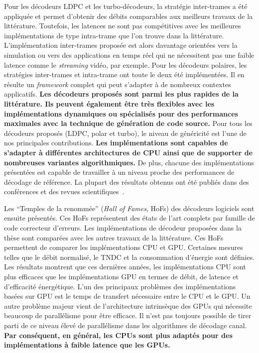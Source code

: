 Pour les décodeurs LDPC et les turbo-décodeurs, la stratégie inter-trames a été
appliquée et permet d'obtenir des débits comparables aux meilleurs travaux de la
littérature. Toutefois, les latences ne sont pas compétitives avec les
meilleures implémentations de type intra-trame que l'on trouve dans la
littérature. L'implémentation inter-trames proposée est alors davantage
orientées vers la simulation ou vers des applications en temps réel qui ne
nécessitent pas une faible latence comme le \emph{streaming} vidéo, par exemple.
Pour les décodeurs polaires, les stratégies inter-trames et intra-trame ont
toute le deux été implémentées. Il en résulte un \emph{framework} complet qui
peut s'adapter à de nombreux contextes applicatifs. \textbf{Les décodeurs
proposés sont parmi les plus rapides de la littérature. Ils peuvent également
être très flexibles avec les implémentations dynamiques ou spécialisés pour des
performances maximales avec la technique de génération de code source.} Pour
tous les décodeurs proposés (LDPC, polar et turbo), le niveau de généricité est
l'une de nos principales contributions. \textbf{Les implémentations sont
capables de s'adapter à différentes architectures de CPU ainsi que de supporter
de nombreuses variantes algorithmiques.} De plus, chacune des implémentations
présentées est capable de travailler à un niveau proche des performances de
décodage de référence. La plupart des résultats obtenus ont été publiés dans des
conférences et des revues scientifiques~\cite{Ghaffari2019,Leonardon2019,
Cassagne2015c,Cassagne2016b,Cassagne2016a}.

Les ``Temples de la renommée'' (\emph{Hall of Fames}, HoFs) des décodeurs
logiciels sont ensuite présentés. Ces HoFs représentent des états de l'art
complets par famille de code correcteur d'erreurs. Les implémentations de
décodeur proposées dans la thèse sont comparées avec les autres travaux de la
littérature. Ces HoFs permettent de comparer les implémentations CPU et GPU.
Certaines mesures telles que le débit normalisé, le TNDC et la consommation
d'énergie sont définies. Les résultats montrent que ces dernières années, les
implémentations CPU sont plus efficaces que les implémentations GPU en termes de
débit, de latence et d'efficacité énergétique. L'un des principaux problèmes des
implémentations basées sur GPU est le temps de transfert nécessaire entre le
CPU et le GPU. Un autre problème majeur vient de l'architecture intrinsèque des
GPUs qui nécessite beaucoup de parallélisme pour être efficace. Il n'est pas
toujours possible de tirer parti de ce niveau élevé de parallélisme dans les
algorithmes de décodage canal. \textbf{Par conséquent, en général, les CPUs sont
plus adaptés pour des implémentations à faible latence que les GPUs.}

